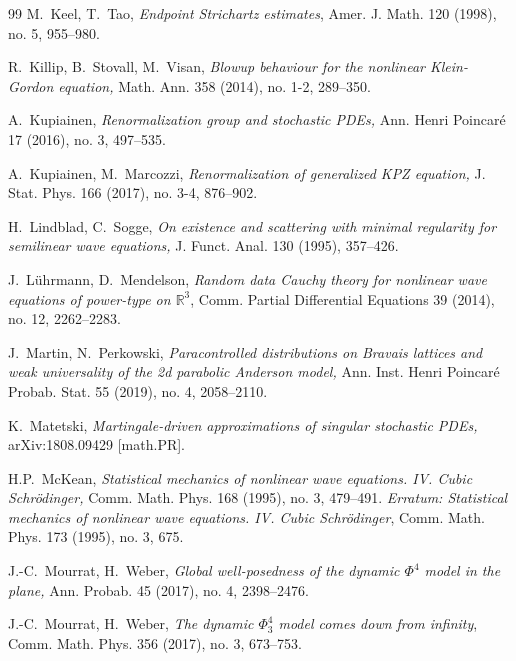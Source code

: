 \documentclass[%
11pt,  reqno]{amsart}
\newcommand{\1}{\hspace{0.2mm}\text{I}\hspace{0.2mm}}
\numberwithin{equation}{section}
\numberwithin{theorem}{section}
\begin{document}
\begin{thebibliography}{99}
M.~Keel, T.~Tao, {\it Endpoint Strichartz estimates},  Amer. J. Math. 120 (1998), no. 5, 955--980.


R.~Killip, B.~Stovall, M.~Visan, 
{\it Blowup behaviour for the nonlinear Klein-Gordon equation,} Math. Ann. 358 (2014), no. 1-2, 289--350.



A.~Kupiainen, 
{\it Renormalization group and stochastic PDEs,} Ann. Henri Poincar\'e 17 (2016), no. 3, 497--535. 

A.~Kupiainen,  M.~Marcozzi,
{\it Renormalization of {generalized} {KPZ} {equation},}
J. Stat. Phys. 166 (2017), no. 3-4, 876--902.


H.~Lindblad, C.~Sogge, {\it On existence and scattering with minimal regularity for semilinear wave equations,} J. Funct. Anal. 130 (1995), 357--426.


J.~L\"uhrmann, D.~Mendelson,
{\it Random data Cauchy theory for nonlinear wave equations of power-type on $\mathbb{R}^3$},
 Comm. Partial Differential Equations  39 (2014), no. 12, 2262--2283.

J.~Martin,  N.~Perkowski,
{\it Paracontrolled distributions on {Bravais} lattices and weak
  universality of the 2d parabolic {Anderson} model,}
 Ann. Inst. Henri Poincar\'e Probab. Stat. 55 (2019), no. 4, 2058--2110.


K.~Matetski,
{\it Martingale-driven approximations of singular stochastic {PDEs},}
arXiv:1808.09429 [math.PR].

H.P.~McKean, 
{\it Statistical mechanics of nonlinear wave equations. IV. Cubic Schr\"odinger,} 
 Comm. Math. Phys. 168 (1995), no. 3, 479--491. 
 {\it Erratum: Statistical mechanics of nonlinear wave equations. IV. Cubic Schr\"odinger}, Comm. Math. Phys. 173 (1995), no. 3, 675.





J.-C.~Mourrat, H.~Weber,
{\it Global well-posedness of the dynamic $\Phi^4$ model in the plane,}
 Ann. Probab. 45 (2017), no. 4, 2398--2476.



J.-C.~Mourrat, H.~Weber,
{\it The dynamic $\Phi^4_3$ model comes down from infinity}, 
Comm. Math. Phys. 356 (2017), no. 3, 673--753.




\end{thebibliography}
\end{document}
